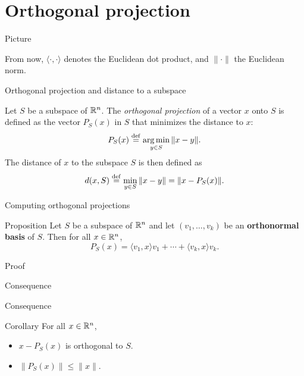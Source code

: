 \documentclass{beamer}
\begin{document}
\section{Orthogonal projection}

\begin{frame}[t]{Picture}
	\grid

	\vspace{-0.24cm}
	From now, $\langle \cdot, \cdot \rangle$ denotes the Euclidean dot product, and $\| \cdot \|$ the Euclidean norm.
\end{frame}

\begin{frame}[t]{Orthogonal projection and distance to a subspace}
	\begin{definition}
		Let $S$ be a subspace of $\mathbb{R}^n$. The \emph{orthogonal projection} of a vector $x$ onto $S$ is defined as the vector $P_S(x)$ in $S$ that minimizes the distance to $x$:
		$$
		P_S(x) \overset{\rm def}{=} \operatorname*{arg\,min}_{y \in S} \|x - y\|.
		$$
		The distance of $x$ to the subspace $S$ is then defined as
		$$
		d(x,S) \overset{\rm def}{=} \min_{y \in S} \| x - y \| = \|x - P_S(x)\|.
		$$
	\end{definition}
\end{frame}

\begin{frame}[t]{Computing orthogonal projections}
	\grid 

	\vspace{-0.4cm}
	\begin{block}{Proposition}
		Let $S$ be a subspace of $\mathbb{R}^n$ and let $(v_1, \dots, v_k)$ be an \textbf{orthonormal basis} of $S$. Then for all $x \in \mathbb{R}^n$,
		$$P_S(x) = \langle v_1, x \rangle v_1 + \cdots + \langle v_k, x \rangle v_k.$$
	\end{block}
\end{frame}

\begin{frame}[t]{Proof}
	\grid

\end{frame}
\begin{frame}[t]{Consequence}
	\grid

\end{frame}


\begin{frame}[t]{Consequence}
	\grid

	\vspace{-0.4cm}
	\begin{block}{Corollary}
		For all $x \in \mathbb{R}^n$,
		\begin{itemize}
			\item $x - P_S(x)$ is orthogonal to $S$.
			\item $\|P_S(x) \| \leq \|x\|$.
		\end{itemize}
	\end{block}
\end{frame}
\end{document}

